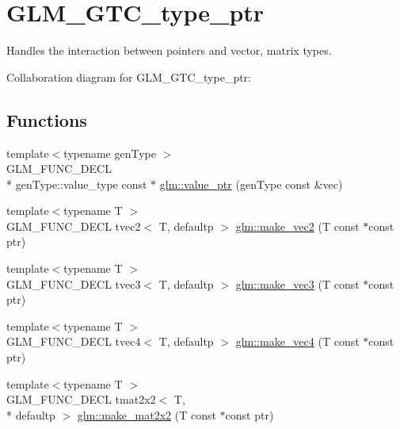\hypertarget{group__gtc__type__ptr}{\section{G\-L\-M\-\_\-\-G\-T\-C\-\_\-type\-\_\-ptr}
\label{group__gtc__type__ptr}
}


Handles the interaction between pointers and vector, matrix types.  


Collaboration diagram for G\-L\-M\-\_\-\-G\-T\-C\-\_\-type\-\_\-ptr\-:
\subsection*{Functions}
\begin{DoxyCompactItemize}
\item 
{\footnotesize template$<$typename gen\-Type $>$ }\\G\-L\-M\-\_\-\-F\-U\-N\-C\-\_\-\-D\-E\-C\-L \\*
gen\-Type\-::value\-\_\-type const $\ast$ \hyperlink{group__gtc__type__ptr_gaf019636bb8bd7c9efb7c7ce3bb23bcfc}{glm\-::value\-\_\-ptr} (gen\-Type const \&vec)
\item 
{\footnotesize template$<$typename T $>$ }\\G\-L\-M\-\_\-\-F\-U\-N\-C\-\_\-\-D\-E\-C\-L tvec2$<$ T, defaultp $>$ \hyperlink{group__gtc__type__ptr_ga5f7393c30970c5949be13ceb525093a6}{glm\-::make\-\_\-vec2} (T const $\ast$const ptr)
\item 
{\footnotesize template$<$typename T $>$ }\\G\-L\-M\-\_\-\-F\-U\-N\-C\-\_\-\-D\-E\-C\-L tvec3$<$ T, defaultp $>$ \hyperlink{group__gtc__type__ptr_ga86f4bc63570db86346db2e567fb760f6}{glm\-::make\-\_\-vec3} (T const $\ast$const ptr)
\item 
{\footnotesize template$<$typename T $>$ }\\G\-L\-M\-\_\-\-F\-U\-N\-C\-\_\-\-D\-E\-C\-L tvec4$<$ T, defaultp $>$ \hyperlink{group__gtc__type__ptr_ga152345176b8951c15711f6ed4f6fc237}{glm\-::make\-\_\-vec4} (T const $\ast$const ptr)
\item 
{\footnotesize template$<$typename T $>$ }\\G\-L\-M\-\_\-\-F\-U\-N\-C\-\_\-\-D\-E\-C\-L tmat2x2$<$ T, \\*
defaultp $>$ \hyperlink{group__gtc__type__ptr_gadb29e510762e1042069cb28bf24ae990}{glm\-::make\-\_\-mat2x2} (T const $\ast$const ptr)
\item 

\end{DoxyCompactItemize}
